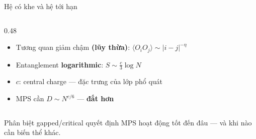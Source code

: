 \documentclass[aspectratio=169, 11pt]{beamer}
\begin{document}
\begin{frame}[shrink=5]{Hệ có khe và hệ tới hạn}
\begin{columns}[T]
\begin{column}{0.48\textwidth}
{\small
\begin{itemize}
  \item Tương quan giảm chậm \textbf{(lũy thừa)}: $\langle O_i O_j\rangle \sim |i{-}j|^{-\eta}$
  \item Entanglement \textbf{logarithmic}: $S \sim \frac{c}{3}\log N$
  \item $c$: central charge — đặc trưng của lớp phổ quát
  \item MPS cần $D \sim N^{c/6}$ — \textbf{đắt hơn}
\end{itemize}}

\end{column}
\end{columns}

\vspace{6pt}
{\small\textcolor{dimtext}{Phân biệt gapped/critical quyết định MPS hoạt động tốt đến đâu — và khi nào cần biến thể khác.}}

\end{frame}
\end{document}
